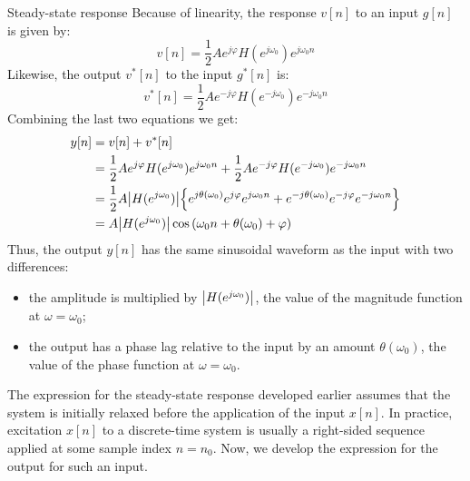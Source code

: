 \documentclass[../../main/main.tex]{subfiles}
\begin{document}
\begin{example}{Steady-state response}{}
    Because of linearity, the response \( v[n] \) to an input \( g[n] \) is given by:
    \begin{equation}
        v[n]
        =
        \frac{1}{2} A e^{j \varphi} H(e^{j \omega_{0}}) e^{j\omega_{0}n}
        \label{eq:L09_S45_1}
    \end{equation}
    Likewise, the output \( v^*[n] \) to the input \( g^*[n] \) is:
    \begin{equation}
        v^*[n]
        =
        \frac{1}{2} A e^{-j \varphi} H(e^{-j \omega_{0}}) e^{-j\omega_{0}n}
        \label{eq:L09_S45_2}
    \end{equation}
    Combining the last two equations we get:
    \begin{align}
        y[n]
        &=
            v[n] + v^{*}[n] \nonumber   \\
        &=
            \frac{1}{2} A e^{j \varphi} H(e^{j \omega_{0}}) e^{j\omega_{0}n} + \frac{1}{2} A e^{-j \varphi} H(e^{-j \omega_{0}}) e^{-j\omega_{0}n}  \nonumber   \\
        &=
            \frac{1}{2} A \abs{H(e^{j \omega_{0}})} \qty{e^{j \theta(\omega_{0})} e^{j \varphi} e^{j \omega_{0}n} + e^{-j \theta(\omega_{0})} e^{-j \varphi} e^{-j \omega_{0}n}}    \nonumber   \\
        &=
            A \abs{H(e^{j \omega_{0}})} \cos\qty(\omega_{0}n + \theta(\omega_{0}) + \varphi)
    \end{align}
    Thus, the output \( y[n] \) has the same sinusoidal waveform as the input with two differences:
    \begin{itemize}
        \item the amplitude is multiplied by \( \abs{H(e^{j \omega_{0}})} \), the value of the magnitude function at \( \omega = \omega_{0} \);
        \item the output has a phase lag relative to the input by an amount \( \theta(\omega_{0}) \), the value of the phase function at \( \omega = \omega_{0} \).
    \end{itemize}
\end{example}

The expression for the steady-state response developed earlier assumes that the system is initially relaxed before the application of the input \( x[n] \). In practice, excitation \( x[n] \) to a discrete-time system is usually a right-sided sequence applied at some sample index \( n = n_{0} \). Now, we develop the expression for the output for such an input.
\end{document}
